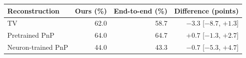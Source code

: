 \begin{tabular}{lrrr}
\toprule
Reconstruction & Ours (\%) & End-to-end (\%) & Difference (points) \\
\midrule
TV & 62.0 & 58.7 & $-3.3$ [$-8.7$, $+1.3$] \\
Pretrained PnP & 64.0 & 64.7 & $+0.7$ [$-1.3$, $+2.7$] \\
Neuron-trained PnP & 44.0 & 43.3 & $-0.7$ [$-5.3$, $+4.7$] \\
\bottomrule
\end{tabular}
